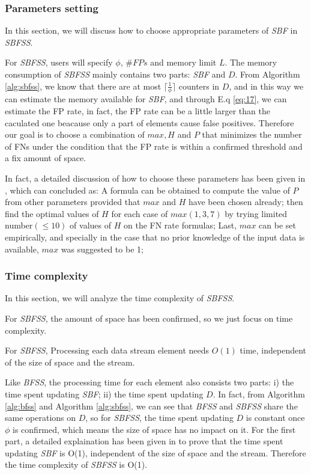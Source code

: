 \documentclass[conference]{IEEEtran}
\begin{document}
\subsubsection{\textbf{Parameters setting}}
In this section, we will discuss how to choose appropriate parameters of \emph{SBF} in \emph{SBFSS}.\par 
For \emph{SBFSS}, users will specify $\phi$, $\#FPs$ and memory limit $L$. The memory consumption of \emph{SBFSS} mainly contains two parts: \emph{SBF} and $D$. From Algorithm \ref{alg:sbfss}, we know that there are at most $\lceil\frac{1}{\phi}\rceil$ counters in $D$, and in this way we can estimate the memory available for \emph{SBF}, and through E.q \ref{eq:17}, we can estimate the FP rate, in fact, the FP rate can be a little larger than the caculated one beacause only a part of elements cause false positives. Therefore our goal is to choose a combination of $max,H$ and $P$ that minimizes the number of FNs under the condition that the FP rate is within a confirmed threshold and a fix amount of space.\par
In fact, a detailed discussion of how to choose these parameters has been given in \cite{IEEEexample:sbf}, which can concluded as: A formula can be obtained to compute the value of $P$ from other parameters provided that $max$ and $H$ have been chosen already; then find the optimal values of $H$ for each case of $max(1,3,7)$ by trying limited number$(\leq 10)$ of values of $H$ on the FN rate formulas; Last, $max$ can be set empirically, and specially in the case that no prior knowledge of the input data is available, $max$ was suggested to be 1; 

\subsubsection{\textbf{Time complexity}}
In this section, we will analyze the time complexity of \emph{SBFSS}.\par
For \emph{SBFSS}, the amount of space has been confirmed, so we just focus on time complexity.

\begin{theorem}\label{thm:8}
For \emph{SBFSS}, Processing each data stream element needs $O(1)$ time, independent of the size of space and the stream.
\end{theorem}

\begin{IEEEproof}
Like \emph{BFSS}, the processing time for each element also consists two parts: i) the time spent updating \emph{SBF}; ii) the time spent updating $D$. In fact, from Algorithm \ref{alg:bfss} and Algorithm \ref{alg:sbfss}, we can see that \emph{BFSS} and \emph{SBFSS} share the same operations on $D$, so for \emph{SBFSS}, the time spent updating $D$ is constant once $\phi$ is confirmed, which means the size of space has no impact on it. For the first part, a detailed explaination has been given in \cite{IEEEexample:sbf} to prove that the time spent updating \emph{SBF} is O(1), independent of the size of space and the stream. Therefore the time complexity of \emph{SBFSS} is O(1).
\end{IEEEproof}
\end{document}
